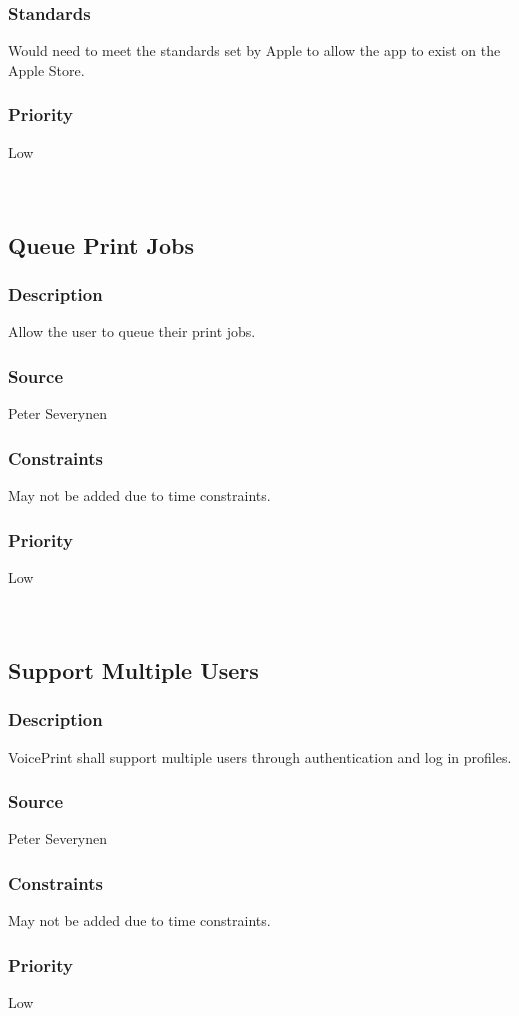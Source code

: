 \subsubsection{Standards}
Would need to meet the standards set by Apple to allow the app to exist on the Apple Store.
\subsubsection{Priority}
Low\\
\\
\\
\subsection{Queue Print Jobs}
\subsubsection{Description}
Allow the user to queue their print jobs.
\subsubsection{Source}
Peter Severynen
\subsubsection{Constraints}
May not be added due to time constraints.
\subsubsection{Priority}
Low\\
\\
\\
\subsection{Support Multiple Users}
\subsubsection{Description}
VoicePrint shall support multiple users through authentication and log in profiles.
\subsubsection{Source}
Peter Severynen
\subsubsection{Constraints}
May not be added due to time constraints.
\subsubsection{Priority}
Low